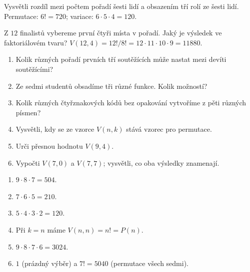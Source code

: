 \documentclass[11pt,a4paper]{article}
\begin{document}
\begin{zadaniReseniBox}[title={Samostatná práce 3}]
Vysvětli rozdíl mezi počtem pořadí šesti lidí a obsazením tří rolí ze šesti lidí.
\tcblower
Permutace: $6!=720$; variace: $6\cdot5\cdot4=120$.
\end{zadaniReseniBox}




\begin{zadaniReseniBox}[title={Rozšíření 1}]
Z $12$ finalistů vybereme první čtyři místa v pořadí. Jaký je výsledek ve faktoriálovém tvaru?
\tcblower
$V(12,4)=12!/8!=12\cdot11\cdot10\cdot9=11880$.
\end{zadaniReseniBox}





\begin{zadaniReseniBox}[title={Domácí úkol}]

\begin{enumerate}[label=\alph*),leftmargin=*,itemsep=2pt]

\item Kolik různých pořadí prvních tří soutěžících může nastat mezi devíti soutěžícími?
\item Ze sedmi studentů obsadíme tři různé funkce. Kolik možností?
\item Kolik různých čtyřznakových kódů bez opakování vytvoříme z pěti různých písmen?
\item Vysvětli, kdy se ze vzorce $V(n,k)$ stává vzorec pro permutace.
\item Urči přesnou hodnotu $V(9,4)$.
\item Vypočti $V(7,0)$ a $V(7,7)$; vysvětli, co oba výsledky znamenají.

\end{enumerate}

\tcblower

\begin{enumerate}[label=\alph*),leftmargin=*,itemsep=2pt]

\item $9\cdot8\cdot7=504$.
\item $7\cdot6\cdot5=210$.
\item $5\cdot4\cdot3\cdot2=120$.
\item Při $k=n$ máme $V(n,n)=n!=P(n)$.
\item $9\cdot8\cdot7\cdot6=3024$.
\item $1$ (prázdný výběr) a $7!=5040$ (permutace všech sedmi).

\end{enumerate}

\end{zadaniReseniBox}

\end{document}
